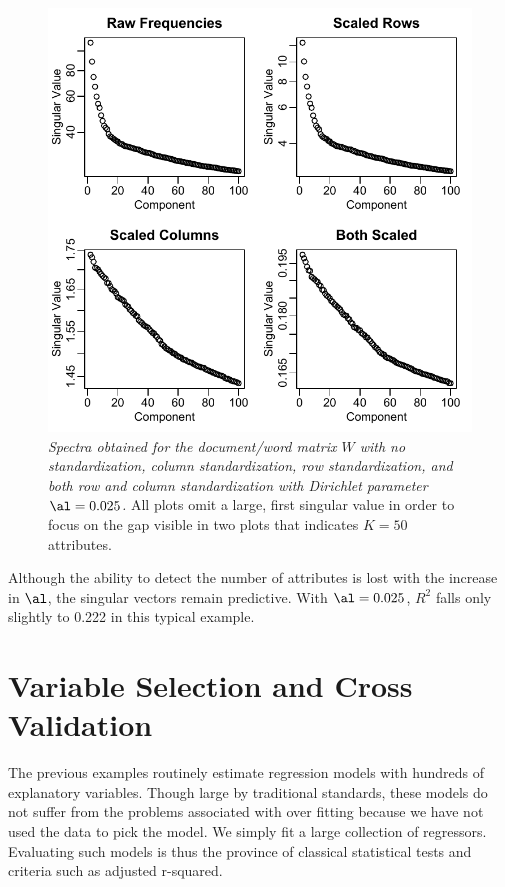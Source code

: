 \documentclass[12pt]{article}
\begin{document}
 
\begin{figure}
\caption{ \label{fig:spectratwo} 
{ \sl Spectra obtained for the document/word matrix $W$ with no standardization, column standardization, row standardization, and both row and column standardization with Dirichlet parameter $\al = 0.025$.} All plots omit a large, first singular value in order to focus on the gap visible in two plots that indicates $K=50$ attributes.}
 \centerline{
 \vspace{0.1in}
 \includegraphics[width=6.0in]{figures/spectra2} }
 \end{figure}

Although the ability to detect the number of attributes is lost with the increase in $\al$, the singular vectors remain predictive.  With $\al=0.025$, $R^2$ falls only slightly to 0.222 in this typical example.
 
\section{Variable Selection and Cross Validation}
\label{sec:cv}

The previous examples routinely estimate regression models with hundreds of explanatory variables.  Though large by traditional standards, these models do not suffer from the problems associated with over fitting because we have not used the data to pick the model.  We simply fit a large collection of regressors.  Evaluating such models is thus the province of classical statistical tests and criteria such as adjusted r-squared.  
\end{document}
